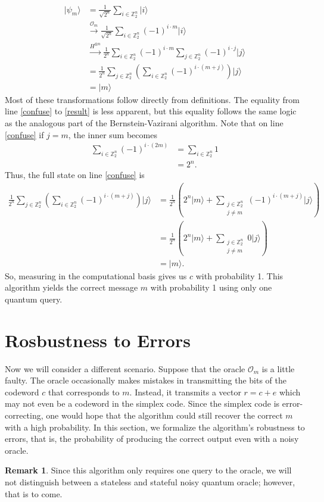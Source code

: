 \documentclass[12pt,twoside]{reedthesis}
\theoremstyle{definition}
\newtheorem{remark}[theorem]{Remark}
\newcommand{\Z}{\mathbb{Z}}
\newcommand{\ket}[1]{\ensuremath{\lvert #1\rangle}\xspace}
\begin{document}
\begin{align}
\ket{\psi_m}
& =  \frac{1}{\sqrt{2^n}} \sum_{i \in \Z_2^n} \ket{i} \\
& \xrightarrow{\mathcal{O}_m} \frac{1}{\sqrt{2^n}} \sum_{i \in \Z_2^n} (-1)^{i \cdot m} \ket{i} \\
& \xrightarrow{H^{\otimes n}} \frac{1}{2^n} \sum_{i \in \Z_2^n} (-1)^{i \cdot m} \sum_{j \in \Z_2^n} (-1)^{i \cdot j} \ket{j} \\
& = \frac{1}{2^n} \sum_{j \in \Z_2^n} \left( \sum_{i \in \Z_2^n} (-1)^{i\cdot (m +j)} \right) \ket{j} \label{confuse}\\
& = \ket{m} \label{result}
\end{align}
Most of these transformations follow directly from definitions. The equality from line \ref{confuse} to \ref{result} is less apparent, but this equality follows the same logic as the analogous part of the Bernstein-Vazirani algorithm. Note that on line \ref{confuse} if $j = m$, the inner sum becomes 
\begin{align*}
\sum_{i \in \Z_2^n} (-1)^{i \cdot (2m)} 
&= \sum_{i \in \Z_2^n} 1 \\
& = {2^n}.
\end{align*}
Thus, the full state on line \ref{confuse} is 
\begin{align*}
\frac{1}{2^n} \sum_{j \in \Z_2^n} \left( \sum_{i \in \Z_2^n} (-1)^{i\cdot (m +j)} \right) \ket{j}
& = \frac{1}{2^n} \left (2^n \ket{m}+  \sum\limits_{\substack{j \in \Z_2^n \\ j \neq m}}
 (-1)^{i\cdot (m +j)}\ket{j} \right) \\
 & = \frac{1}{2^n} \left (2^n \ket{m}+  \sum\limits_{\substack{j \in \Z_2^n \\ j \neq m}}
0\ket{j} \right) \\
& = \ket{m}.
\end{align*}
So, measuring in the computational basis gives us $c$ with probability 1. This algorithm yields the correct message $m$ with probability 1 using only one quantum query.
\section{Rosbustness to Errors}
Now we will consider a different scenario. Suppose that the oracle $\mathcal{O}_m$ is a little faulty. The oracle occasionally makes mistakes in transmitting the bits of the codeword $c$ that corresponds to $m$. Instead, it transmits a vector $r = c+ e$ which may not even be a codeword in the simplex code. Since the simplex code is error-correcting, one would hope that the algorithm could still recover the correct $m$ with a high probability. In this section, we formalize the algorithm's robustness to errors, that is, the probability of producing the correct output even with a noisy oracle. 
\begin{remark}
Since this algorithm only requires one query to the oracle, we will not distinguish between a stateless and stateful noisy quantum oracle; however, that is to come.
\end{remark}
\end{document}
